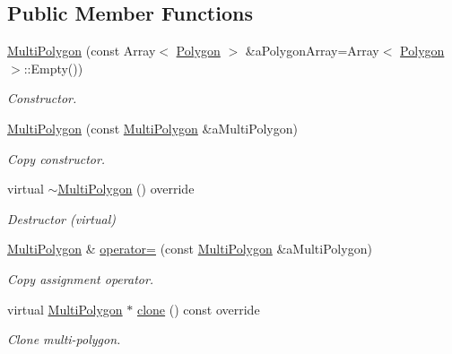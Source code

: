 \subsection*{Public Member Functions}
\begin{DoxyCompactItemize}
\item 
\hyperlink{classostk_1_1math_1_1geom_1_1d2_1_1objects_1_1_multi_polygon_ad65532c9b323b5358cdcdd43da5ef9bd}{Multi\+Polygon} (const Array$<$ \hyperlink{classostk_1_1math_1_1geom_1_1d2_1_1objects_1_1_polygon}{Polygon} $>$ \&a\+Polygon\+Array=Array$<$ \hyperlink{classostk_1_1math_1_1geom_1_1d2_1_1objects_1_1_polygon}{Polygon} $>$\+::Empty())
\begin{DoxyCompactList}\small\item\em Constructor. \end{DoxyCompactList}\item 
\hyperlink{classostk_1_1math_1_1geom_1_1d2_1_1objects_1_1_multi_polygon_ac5b053bb605f9c24de35f0e35e3b1ee8}{Multi\+Polygon} (const \hyperlink{classostk_1_1math_1_1geom_1_1d2_1_1objects_1_1_multi_polygon}{Multi\+Polygon} \&a\+Multi\+Polygon)
\begin{DoxyCompactList}\small\item\em Copy constructor. \end{DoxyCompactList}\item 
virtual \hyperlink{classostk_1_1math_1_1geom_1_1d2_1_1objects_1_1_multi_polygon_a00964958733e630a99d445f72b9c27ba}{$\sim$\+Multi\+Polygon} () override
\begin{DoxyCompactList}\small\item\em Destructor (virtual) \end{DoxyCompactList}\item 
\hyperlink{classostk_1_1math_1_1geom_1_1d2_1_1objects_1_1_multi_polygon}{Multi\+Polygon} \& \hyperlink{classostk_1_1math_1_1geom_1_1d2_1_1objects_1_1_multi_polygon_a7864532e16a3db3ced54c09f40218af9}{operator=} (const \hyperlink{classostk_1_1math_1_1geom_1_1d2_1_1objects_1_1_multi_polygon}{Multi\+Polygon} \&a\+Multi\+Polygon)
\begin{DoxyCompactList}\small\item\em Copy assignment operator. \end{DoxyCompactList}\item 
virtual \hyperlink{classostk_1_1math_1_1geom_1_1d2_1_1objects_1_1_multi_polygon}{Multi\+Polygon} $\ast$ \hyperlink{classostk_1_1math_1_1geom_1_1d2_1_1objects_1_1_multi_polygon_a89fdf23e9f496c2e5f598c0dc8981c86}{clone} () const override
\begin{DoxyCompactList}\small\item\em Clone multi-\/polygon. \end{DoxyCompactList}\item 

\end{DoxyCompactItemize}
